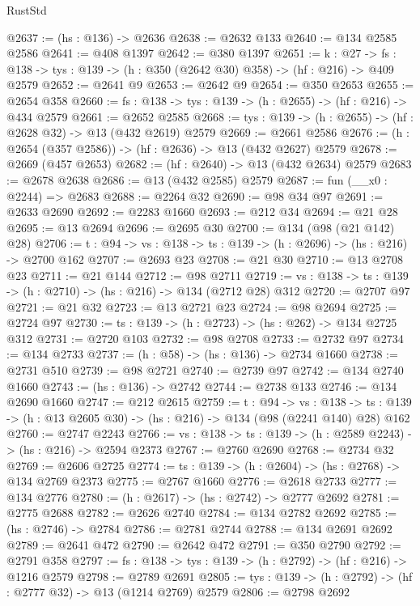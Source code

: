 \begin{lexlean}{RustStd}
\begin{coremodule}
@2637 := (hs : @136) -> @2636
@2638 := @2632 @133
@2640 := @134 @2585 @2586
@2641 := @408 @1397
@2642 := @380 @1397
@2651 := {k : @27} ->
  {fs : @138} -> {tys : @139} -> (h : @350 (@2642 @30) @358) -> (hf : @216) -> @409 @2579
@2652 := @2641 @9
@2653 := @2642 @9
@2654 := @350 @2653
@2655 := @2654 @358
@2660 := {fs : @138} -> {tys : @139} -> (h : @2655) -> (hf : @216) -> @434 @2579
@2661 := @2652 @2585
@2668 := {tys : @139} -> (h : @2655) -> (hf : @2628 @32) -> @13 (@432 @2619) @2579
@2669 := @2661 @2586
@2676 := (h : @2654 (@357 @2586)) -> (hf : @2636) -> @13 (@432 @2627) @2579
@2678 := @2669 (@457 @2653)
@2682 := (hf : @2640) -> @13 (@432 @2634) @2579
@2683 := @2678 @2638
@2686 := @13 (@432 @2585) @2579
@2687 := fun (__x0 : @2244) => @2683
@2688 := @2264 @32
@2690 := @98 @34 @97
@2691 := @2633 @2690
@2692 := @2283 @1660
@2693 := @212 @34
@2694 := @21 @28
@2695 := @13 @2694
@2696 := @2695 @30
@2700 := @134 (@98 (@21 @142) @28)
@2706 := {t : @94} -> {vs : @138} -> {ts : @139} -> (h : @2696) -> (hs : @216) -> @2700 @162
@2707 := @2693 @23
@2708 := @21 @30
@2710 := @13 @2708 @23
@2711 := @21 @144
@2712 := @98 @2711
@2719 := {vs : @138} -> {ts : @139} -> (h : @2710) -> (hs : @216) -> @134 (@2712 @28) @312
@2720 := @2707 @97
@2721 := @21 @32
@2723 := @13 @2721 @23
@2724 := @98 @2694
@2725 := @2724 @97
@2730 := {ts : @139} -> (h : @2723) -> (hs : @262) -> @134 @2725 @312
@2731 := @2720 @103
@2732 := @98 @2708
@2733 := @2732 @97
@2734 := @134 @2733
@2737 := (h : @58) -> (hs : @136) -> @2734 @1660
@2738 := @2731 @510
@2739 := @98 @2721
@2740 := @2739 @97
@2742 := @134 @2740 @1660
@2743 := (hs : @136) -> @2742
@2744 := @2738 @133
@2746 := @134 @2690 @1660
@2747 := @212 @2615
@2759 := {t : @94} ->
  {vs : @138} ->
  {ts : @139} -> (h : @13 @2605 @30) -> (hs : @216) -> @134 (@98 (@2241 @140) @28) @162
@2760 := @2747 @2243
@2766 := {vs : @138} -> {ts : @139} -> (h : @2589 @2243) -> (hs : @216) -> @2594 @2373
@2767 := @2760 @2690
@2768 := @2734 @32
@2769 := @2606 @2725
@2774 := {ts : @139} -> (h : @2604) -> (hs : @2768) -> @134 @2769 @2373
@2775 := @2767 @1660
@2776 := @2618 @2733
@2777 := @134 @2776
@2780 := (h : @2617) -> (hs : @2742) -> @2777 @2692
@2781 := @2775 @2688
@2782 := @2626 @2740
@2784 := @134 @2782 @2692
@2785 := (hs : @2746) -> @2784
@2786 := @2781 @2744
@2788 := @134 @2691 @2692
@2789 := @2641 @472
@2790 := @2642 @472
@2791 := @350 @2790
@2792 := @2791 @358
@2797 := {fs : @138} -> {tys : @139} -> (h : @2792) -> (hf : @216) -> @1216 @2579
@2798 := @2789 @2691
@2805 := {tys : @139} -> (h : @2792) -> (hf : @2777 @32) -> @13 (@1214 @2769) @2579
@2806 := @2798 @2692

\end{coremodule}
\end{lexlean}
